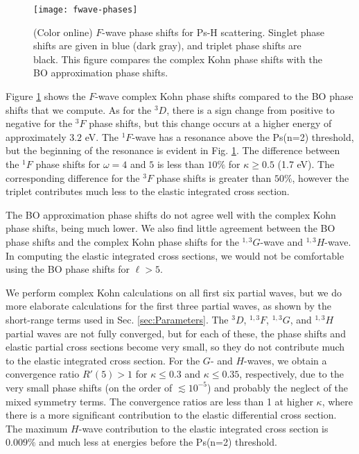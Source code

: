 \documentclass[preprint,showpacs,showkeys,preprintnumbers,amsmath,amssymb,longbibliography,pra,aps]{revtex4-1}
\begin{document}
\begin{figure}[H]
	\centering
	\texttt{[image: fwave-phases]}
	\caption{(Color online) $F$-wave phase shifts for Ps-H scattering.
Singlet phase shifts are given in blue
(dark gray), and triplet phase shifts are black. This figure
compares the complex Kohn phase shifts with the BO approximation phase shifts.}
	\label{fig:fwave-phases}
\end{figure}

Figure \ref{fig:fwave-phases} shows the $F$-wave complex Kohn phase shifts 
compared to the BO phase shifts that we compute. As for the $^3D$, there
is a sign change 
from positive to negative for the $^3F$ phase shifts, but this change 
occurs at a higher energy of approximately $3.2$ eV. The $^1F$-wave has a 
resonance above the Ps(n=2) threshold, but the beginning of the resonance is 
evident in Fig. \ref{fig:fwave-phases}. The difference between the $^1F$ phase
shifts for $\omega = 4$ and $5$ is less than $10\%$ for $\kappa \geq 0.5$
(1.7 eV). The corresponding difference for the $^3F$ phase shifts is greater
than $50\%$, however the triplet contributes much less to the 
elastic integrated cross section.

The BO approximation phase shifts do
not agree well with the complex Kohn phase shifts, being much lower. We 
also find little agreement between the BO phase shifts and the complex 
Kohn phase shifts for the $^{1,3}G$-wave and $^{1,3}H$-wave.
In computing the elastic integrated cross sections, we would not be 
comfortable using the BO phase shifts for $\ell > 5$.

We perform complex Kohn calculations on all first six partial waves, but 
we do more elaborate calculations for the first three partial waves, as shown 
by the short-range terms used in Sec. \ref{sec:Parameters}.
The $^3D$, $^{1,3}F$, $^{1,3}G$, and $^{1,3}H$ partial waves are not fully
converged, but for each of these, the phase shifts and elastic partial cross 
sections become very small, so they do not contribute much to the elastic
integrated cross section.
For the $G$- and $H$-waves, we obtain a convergence ratio $R'(5) > 1$ for
$\kappa \leq 0.3$ and $\kappa \leq 0.35$, respectively, due to the very small
phase shifts (on the order of $\lesssim 10^{-5}$) and probably the neglect of
the mixed symmetry terms. The convergence ratios
are less than 1 at higher $\kappa$, where there is a more significant
contribution to the elastic differential cross section.
The maximum $H$-wave contribution to the elastic integrated cross
section is $0.009\%$ and much less at energies before the Ps(n=2)
threshold.
\end{document}
